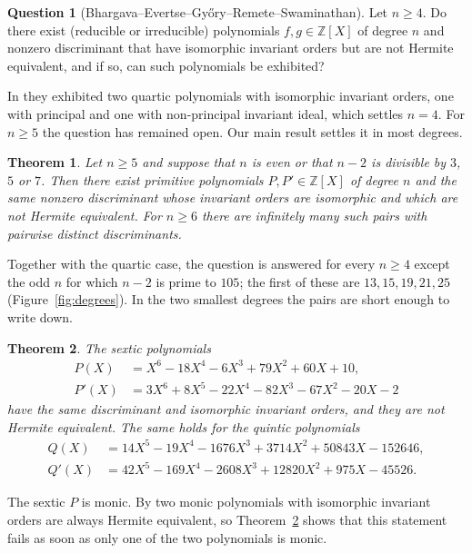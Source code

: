 \documentclass[11pt]{amsart}
\newtheorem{mainthm}{Theorem}
\theoremstyle{definition}
\newtheorem*{question}{Question}
\newcommand{\ZZ}{\mathbb{Z}}
\begin{document}
\begin{question}[Bhargava--Evertse--Gy\H{o}ry--Remete--Swaminathan]
Let $n\ge4$. Do there exist (reducible or irreducible) polynomials $f,g\in\ZZ[X]$ of degree $n$ and nonzero discriminant that have isomorphic invariant orders but are not Hermite equivalent, and if so, can such polynomials be exhibited?
\end{question}

In \cite[Theorem~3.20]{BEGRS23} they exhibited two quartic polynomials with isomorphic invariant orders, one with principal and one with non-principal invariant ideal, which settles $n=4$. For $n\ge5$ the question has remained open. Our main result settles it in most degrees.

\begin{mainthm}\label{thm:A}
Let $n\ge5$ and suppose that $n$ is even or that $n-2$ is divisible by $3$, $5$ or $7$. Then there exist primitive polynomials $P,P'\in\ZZ[X]$ of degree $n$ and the same nonzero discriminant whose invariant orders are isomorphic and which are not Hermite equivalent. For $n\ge6$ there are infinitely many such pairs with pairwise distinct discriminants.
\end{mainthm}

Together with the quartic case, the question is answered for every $n\ge4$ except the odd $n$ for which $n-2$ is prime to $105$; the first of these are $13,15,19,21,25$ (Figure~\ref{fig:degrees}). In the two smallest degrees the pairs are short enough to write down.

\begin{mainthm}\label{thm:B}
The sextic polynomials
\begin{align*}
P(X)&=X^6-18X^4-6X^3+79X^2+60X+10,\\
P'(X)&=3X^6+8X^5-22X^4-82X^3-67X^2-20X-2
\end{align*}
have the same discriminant and isomorphic invariant orders, and they are not Hermite equivalent. The same holds for the quintic polynomials
\begin{align*}
Q(X)&=14X^5-19X^4-1676X^3+3714X^2+50843X-152646,\\
Q'(X)&=42X^5-169X^4-2608X^3+12820X^2+975X-45526.
\end{align*}
\end{mainthm}

The sextic $P$ is monic. By \cite[Corollary~3.16]{BEGRS23} two monic polynomials with isomorphic invariant orders are always Hermite equivalent, so Theorem~\ref{thm:B} shows that this statement fails as soon as only one of the two polynomials is monic.
\end{document}
